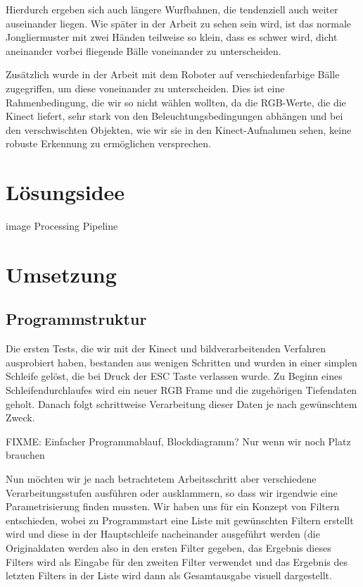 \documentclass[12pt,a4paper,ngerman]{scrartcl}
\begin{document}
Hierdurch ergeben sich auch längere Wurfbahnen, die tendenziell auch weiter 
auseinander liegen. Wie später in der Arbeit zu sehen sein wird, ist das normale
Jongliermuster mit zwei Händen teilweise so klein, dass es schwer wird, dicht 
aneinander vorbei fliegende Bälle voneinander zu unterscheiden.

Zusätzlich wurde in der Arbeit mit dem Roboter auf verschiedenfarbige Bälle 
zugegriffen, um diese voneinander zu unterscheiden. Dies ist eine Rahmenbedingung,
die wir so nicht wählen wollten, da die RGB-Werte, die die Kinect liefert, sehr stark 
von den Beleuchtungsbedingungen abhängen und bei den verschwischten Objekten, wie
wir sie in den Kinect-Aufnahmen sehen, keine robuste Erkennung zu ermöglichen 
versprechen.


\section{Lösungsidee}

image Processing Pipeline

\section{Umsetzung}

\subsection{Programmstruktur}

Die ersten Tests, die wir mit der Kinect und bildverarbeitenden Verfahren 
ausprobiert haben, bestanden aus wenigen Schritten und wurden in einer
simplen Schleife gelöst, die bei Druck der ESC Taste verlassen wurde. Zu Beginn
eines Schleifendurchlaufes wird ein neuer RGB Frame und die zugehörigen 
Tiefendaten geholt. Danach folgt schrittweise Verarbeitung dieser Daten je nach 
gewünschtem Zweck. 

FIXME: Einfacher Programmablauf, Blockdiagramm? Nur wenn wir noch Platz brauchen

Nun möchten wir je nach betrachtetem Arbeitsschritt aber verschiedene 
Verarbeitungsstufen ausführen oder ausklammern, so dass wir irgendwie eine
Parametrisierung finden mussten. Wir haben uns für ein Konzept von Filtern 
entschieden, wobei zu Programmstart eine Liste mit gewünschten Filtern erstellt
wird und diese in der Hauptschleife nacheinander ausgeführt werden (die Originaldaten
werden also in den ersten Filter gegeben, das Ergebnis dieses Filters wird als 
Eingabe für den zweiten Filter verwendet und das Ergebnis des letzten Filters
in der Liste wird dann als Gesamtausgabe visuell dargestellt.
\end{document}
